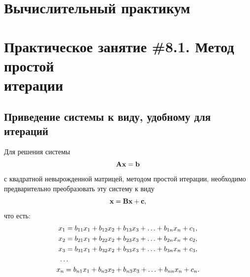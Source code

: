 \documentclass[12pt]{article}
\begin{document}
    \begin{flushright}
	\end{flushright}
	\begin{flushright}
	\end{flushright}
    \section*{Вычислительный практикум}
    \section*{Практическое занятие \#8.1. Метод простой\\итерации}

	\subsection*{Приведение системы к виду, удобному для итераций}
	
	Для решения системы
	\begin{equation}
		\bold{A}\bold{x}=\bold{b}\label{f1}
	\end{equation}
	с квадратной невырожденной матрицей, методом простой итерации, необходимо предварительно преобразовать эту систему к виду
	\begin{equation}
		\bold{x}=\bold{Bx}+\bold{c},\label{f2}
	\end{equation}
	что есть:
	\begin{equation}
		\begin{gathered}
			x_1=b_{11}x_{1}+b_{12}x_2+b_{13}x_3+\ldots+b_{1n}x_{n}+c_{1},\\
			x_2=b_{21}x_{1}+b_{22}x_2+b_{23}x_3+\ldots+b_{2n}x_{n}+c_{2},\\
			x_3=b_{31}x_{1}+b_{32}x_2+b_{33}x_3+\ldots+b_{3n}x_{n}+c_{3},\\
			\ldots\hspace{65mm}\\
			x_n=b_{n1}x_{1}+b_{n2}x_2+b_{n3}x_3+\ldots+b_{nn}x_{n}+c_{n}.\\
		\end{gathered}
	\end{equation}
	
\end{document}
